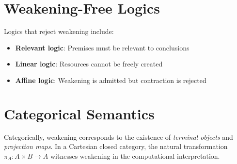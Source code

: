 \section*{Weakening-Free Logics}
\label{sec-weakening-free}

Logics that reject weakening include:
\begin{itemize}
    \item \textbf{Relevant logic}: Premises must be relevant to conclusions
    \item \textbf{Linear logic}: Resources cannot be freely created
    \item \textbf{Affine logic}: Weakening is admitted but contraction is rejected
\end{itemize}

\section*{Categorical Semantics}
\label{sec-weakening-categorical}

Categorically, weakening corresponds to the existence of \emph{terminal objects} and \emph{projection maps}. In a Cartesian closed category, the natural transformation $\pi_A : A \times B \to A$ witnesses weakening in the computational interpretation.

% 
% 
% 
% 
% 
